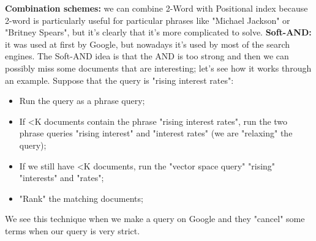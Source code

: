 \textbf{Combination schemes:} we can combine 2-Word with Positional index because 2-word is particularly useful for particular phrases like "Michael Jackson" or "Britney Spears", but it's clearly that it's more complicated to solve.\newline
\textbf{Soft-AND:} it was used at first by Google, but nowadays it's used by most of the search engines. The Soft-AND idea is that the AND is too strong and then we can possibly miss some documents that are interesting; let's see how it works through an example.\newline
Suppose that the query is "rising interest rates":
\begin{itemize}
    \item Run the query as a phrase query;
    \item If <K documents contain the phrase "rising interest rates", run the two phrase queries "rising interest" and "interest rates" (we are "relaxing" the query);
    \item If we still have <K documents, run the "vector space query" "rising" "interests" and "rates";
    \item "Rank" the matching documents;
\end{itemize}
We see this technique when we make a query on Google and they "cancel" some terms when our query is very strict.\newline
